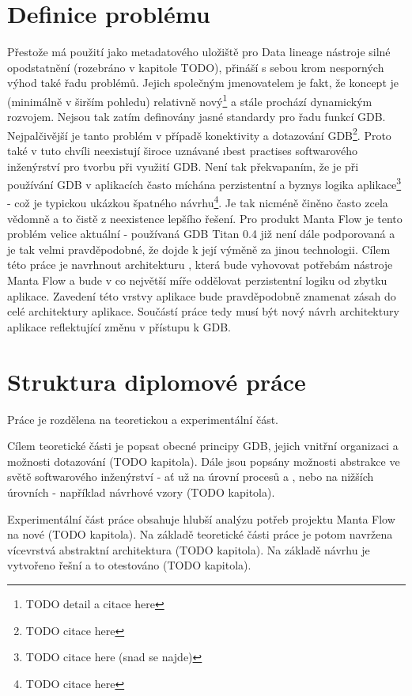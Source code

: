 \section{Definice problému}
Přestože má použití  jako metadatového uložiště pro Data lineage nástroje silné opodstatnění (rozebráno v kapitole TODO), přináší s sebou krom nesporných výhod také řadu problémů. Jejich společným jmenovatelem je fakt, že koncept  je (minimálně v širším pohledu) relativně nový\footnote{TODO detail a citace here} a stále prochází dynamickým rozvojem. Nejsou tak zatím definovány jasné standardy pro řadu funkcí GDB. Nejpalčivější je tanto problém v případě konektivity a dotazování GDB\footnote{TODO citace here}. Proto také v tuto chvíli neexistují široce uznávané \i{best practises} softwarového inženýrství pro tvorbu  při využití GDB. Není tak překvapaním, že je při používání GDB v aplikacích často míchána perzistentní a byznys logika aplikace\footnote{TODO citace here (snad se najde)} - což je typickou ukázkou špatného návrhu\footnote{TODO citace here}. Je tak nicméně činěno často zcela vědomně a to čistě z neexistence lepšího řešení. Pro produkt Manta Flow je tento problém velice aktuální - používaná GDB Titan 0.4 již není dále podporovaná a je tak velmi pravděpodobné, že dojde k její výměně za jinou technologii. Cílem této práce je navrhnout architekturu , která bude vyhovovat potřebám nástroje Manta Flow a bude v co největší míře oddělovat perzistentní logiku od zbytku aplikace. Zavedení této vrstvy aplikace bude pravděpodobně znamenat zásah do celé architektury aplikace. Součástí práce tedy musí být nový návrh architektury aplikace reflektující změnu v přístupu k GDB. 

\section{Struktura diplomové práce}
Práce je rozdělena na teoretickou a experimentální část. 

Cílem teoretické části je popsat obecné principy GDB, jejich vnitřní organizaci a možnosti dotazování (TODO kapitola). Dále jsou popsány možnosti abstrakce ve světě softwarového inženýrství - ať už na úrovní procesů a , nebo na nižších úrovních - například návrhové vzory (TODO kapitola). 

Experimentální část práce obsahuje hlubší analýzu potřeb projektu Manta Flow na nové  (TODO kapitola). Na základě teoretické části práce je potom navržena vícevrstvá abstraktní architektura  (TODO kapitola). Na základě návrhu je vytvořeno  řešní a to otestováno (TODO kapitola). 
